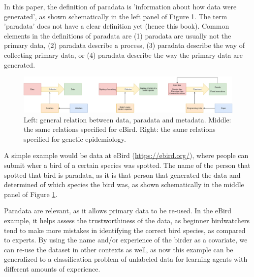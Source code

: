 
In this paper, the definition of paradata
is 'information about how data were generated',
as shown schematically in the left panel of Figure \ref{fig:figure_1}.
The term 'paradata' does not have a clear definition yet (hence this book). 
Common elements in the definitions of paradata are 
(1) paradata are usually not the primary data, (2) paradata describe
a process, (3) paradata describe the way of collecting primary data, or 
(4) paradata describe the way the primary data are generated.

\begin{figure}[!htbp]
  \centering
  \includegraphics[width=\linewidth]{figure_1.png}
  \caption{
    Left: general relation between data, paradata and metadata.
    Middle: the same relations specified for eBird.
    Right: the same relations specified for genetic epidemiology.
  }
  \label{fig:figure_1}
\end{figure}


A simple example would be data at eBird (\url{https://ebird.org/}),
where people can submit wher a bird of a certain species was spotted.
The name of the person that spotted that bird is paradata, 
as it is that person that generated the data and determined of
which species the bird was, 
as shown schematically in the middle panel of Figure \ref{fig:figure_1}.


Paradata are relevant, as it allows primary data to be re-used.
In the eBird example, it helps assess the trustworthiness of the 
data, as beginner birdwatchers tend to make more mistakes in identifying
the correct bird species, as compared to experts.
By using the name and/or experience of the birder as a covariate,
we can re-use the dataset in other contexts as well,
as now this example can be generalized to
a classification problem of unlabeled
data for learning agents with different amounts 
of experience.

